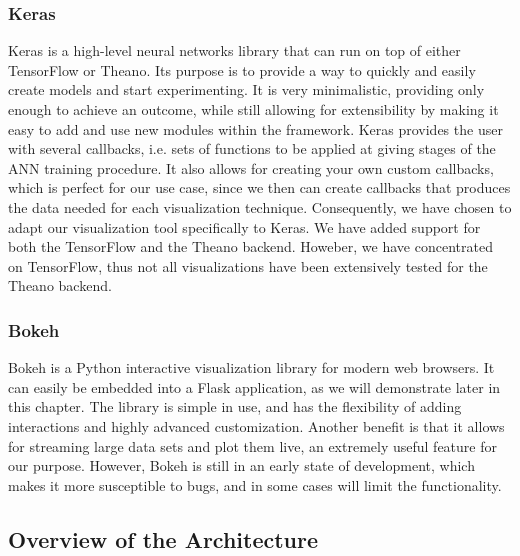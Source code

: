 \subsubsection{Keras}

Keras is a high-level neural networks library that can run on top of either TensorFlow or Theano. Its purpose is to provide a way to quickly and easily create models and start experimenting. It is very minimalistic, providing only enough to achieve an outcome, while still allowing for extensibility by making it easy to add and use new modules within the framework. Keras provides the user with several callbacks, i.e. sets of functions to be applied at giving stages of the ANN training procedure. It also allows for creating your own custom callbacks, which is perfect for our use case, since we then can create callbacks that produces the data needed for each visualization technique. Consequently, we have chosen to adapt our visualization tool specifically to Keras. We have added support for both the TensorFlow and the Theano backend. Howeber, we have concentrated on TensorFlow, thus not all visualizations have been extensively tested for the Theano backend.

\subsubsection{Bokeh}

Bokeh is a Python interactive visualization library for modern web browsers. It can easily be embedded into a Flask application, as we will demonstrate later in this chapter. The library is simple in use, and has the flexibility of adding interactions and highly advanced customization. Another benefit is that it allows for streaming large data sets and plot them live, an extremely useful feature for our purpose. However, Bokeh is still in an early state of development, which makes it more susceptible to bugs, and in some cases will limit the functionality.


\subsection{Overview of the Architecture}

